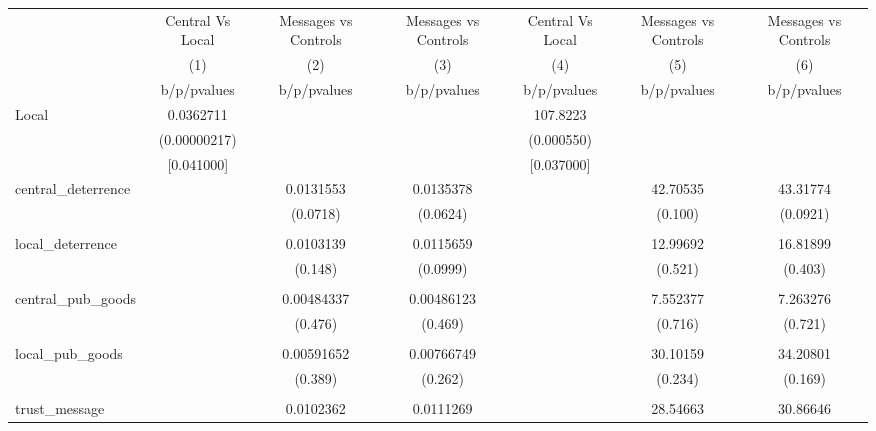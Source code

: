 {
\def\sym#1{\ifmmode^{#1}\else\(^{#1}\)\fi}
\begin{tabular}{l*{6}{c}}
\hline\hline
                &\multicolumn{1}{c}{Central Vs Local}&\multicolumn{1}{c}{Messages vs Controls}&\multicolumn{1}{c}{Messages vs Controls}&\multicolumn{1}{c}{Central Vs Local}&\multicolumn{1}{c}{Messages vs Controls}&\multicolumn{1}{c}{Messages vs Controls}\\
                &\multicolumn{1}{c}{(1)}&\multicolumn{1}{c}{(2)}&\multicolumn{1}{c}{(3)}&\multicolumn{1}{c}{(4)}&\multicolumn{1}{c}{(5)}&\multicolumn{1}{c}{(6)}\\
                &b/p/pvalues&b/p/pvalues&b/p/pvalues&b/p/pvalues&b/p/pvalues&b/p/pvalues\\
\hline
Local           &0.0362711&         &         & 107.8223&         &         \\
                &(0.00000217)&         &         &(0.000550)&         &         \\
                &[0.041000]&         &         &[0.037000]&         &         \\
central\_deterrence&         &0.0131553&0.0135378&         & 42.70535& 43.31774\\
                &         & (0.0718)& (0.0624)&         &  (0.100)& (0.0921)\\
                &         &         &         &         &         &         \\
local\_deterrence&         &0.0103139&0.0115659&         & 12.99692& 16.81899\\
                &         &  (0.148)& (0.0999)&         &  (0.521)&  (0.403)\\
                &         &         &         &         &         &         \\
central\_pub\_goods&         &0.00484337&0.00486123&         & 7.552377& 7.263276\\
                &         &  (0.476)&  (0.469)&         &  (0.716)&  (0.721)\\
                &         &         &         &         &         &         \\
local\_pub\_goods &         &0.00591652&0.00766749&         & 30.10159& 34.20801\\
                &         &  (0.389)&  (0.262)&         &  (0.234)&  (0.169)\\
                &         &         &         &         &         &         \\
trust\_message   &         &0.0102362&0.0111269&         & 28.54663& 30.86646\\

\end{tabular}}
